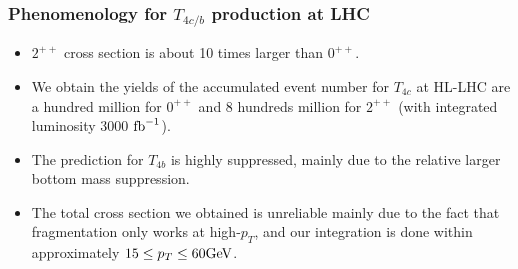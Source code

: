 \begin{frame}
	\frametitle{Phenomenology for $T_{4c/b}$ production at LHC}

	\begin{itemize}
		\item $2^{++}$ cross section is about 10 times larger than $0^{++}$. 
		\item We obtain the yields of the accumulated event number for $T_{4c}$ at HL-LHC are a hundred million for $0^{++}$ and 8 hundreds million for $2^{++}$ (with integrated luminosity 3000 $\rm{fb}^{-1}$). 
		\item The
		prediction for $T_{4b}$ is highly suppressed, mainly due to the relative larger bottom mass suppression.
		\item The total cross section we obtained is unreliable mainly due to the fact that fragmentation only works at high-$p_T$, and our integration is done within approximately $15\leq p_T\leq 60 \rm{GeV}$.
	\end{itemize}

\end{frame}

